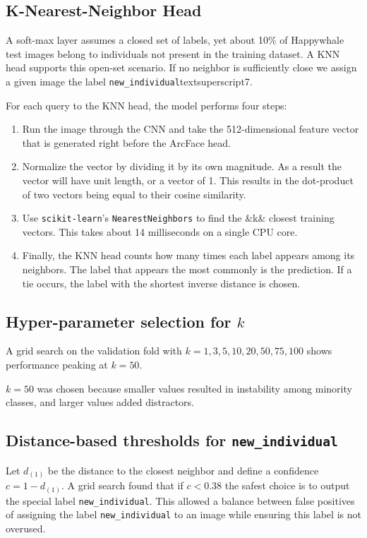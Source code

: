 \documentclass[twocolumn]{article}
\begin{document}
\subsection{K-Nearest-Neighbor Head}

A soft-max layer assumes a closed set of labels, yet about 10\% of Happywhale test images belong to individuals not present in the training dataset. A KNN head supports this open-set scenario. If no neighbor is sufficiently close we assign a given image the label \texttt{new_individual}textsuperscript{7}.

For each query to the KNN head, the model performs four steps:
\begin{enumerate}
    \item Run the image through the CNN and take the 512-dimensional feature vector that is generated right before the ArcFace head.
    \item Normalize the vector by dividing it by its own magnitude. As a result the vector will have unit length, or a vector of 1. This results in the dot-product of two vectors being equal to their cosine similarity.
    \item Use \texttt{scikit-learn}'s \texttt{NearestNeighbors} to find the &k& closest training vectors. This takes about 14 milliseconds on a single CPU core.
    \item Finally, the KNN head counts how many times each label appears among its neighbors.  The label that appears the most commonly is the prediction. If a tie occurs, the label with the shortest inverse distance is chosen.\\
\end{enumerate}

\subsection{Hyper-parameter selection for $k$}

A grid search on the validation fold with $k\!=\!1,3,5,10,20,50,75,100$ shows performance peaking at $k=50$. 

$k=50$ was chosen because smaller values resulted in instability among minority classes, and larger values added distractors.

\subsection{Distance-based thresholds for \texttt{new_individual}}

Let $d_{(1)}$ be the distance to the closest neighbor and define a confidence $c = 1 - d_{(1)}$.
A grid search found that if $c < 0.38$ the safest choice is to output
the special label \texttt{new\_individual}.
This allowed a balance between false positives of assigning the label \texttt{new_individual} to an image while ensuring this label is not overused.
\end{document}
